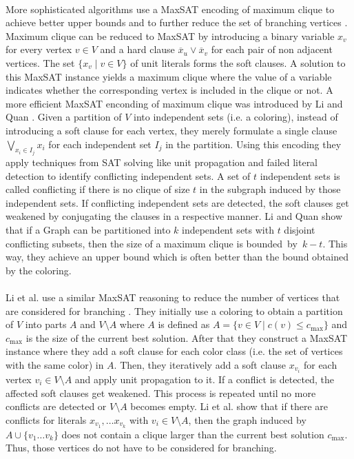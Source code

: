 \documentclass[]{article}
\begin{document}
\paragraph{}
More sophisticated algorithms use a MaxSAT encoding of maximum clique to achieve better upper bounds and to further reduce the set of branching vertices \cite{LiFangXu,LiJiang}. Maximum clique can be reduced to MaxSAT by introducing a binary variable $x_v$ for every vertex $v\in V$ and a hard clause $\overline{x}_u\lor\overline{x}_v$ for each pair of non adjacent vertices. The set $\{x_v\;|\;v\in V\}$ of unit literals forms the soft clauses. A solution to this MaxSAT instance yields a maximum clique where the value of a variable indicates whether the corresponding vertex is included in the clique or not. A more efficient MaxSAT enconding of maximum clique was introduced by Li and Quan \cite{LiQuan}. Given a partition of $V$ into independent sets (i.e. a coloring), instead of introducing a soft clause for each vertex, they merely formulate a single clause $\bigvee_{x_i\in I_j} x_i$ for each independent set $I_j$ in the partition. Using this encoding they apply techniques from SAT solving like unit propagation and failed literal detection to identify conflicting independent sets. A set of $t$ independent sets is called conflicting if there is no clique of size $t$ in the subgraph induced by those independent sets. If conflicting independent sets are detected, the soft clauses get weakened by conjugating the clauses in a respective manner. Li and Quan show that if a Graph can be partitioned into $k$ independent sets with $t$ disjoint conflicting subsets, then the size of a maximum clique is bounded~by~$k-t$. This way, they achieve an upper bound which is often better than the bound obtained by the coloring.
\paragraph{}
Li et al. use a similar MaxSAT reasoning to reduce the number of vertices that are considered for branching \cite{LiMaxSat}. They initially use a coloring to obtain a partition of $V$ into parts $A$ and $V\setminus A$ where $A$ is defined as $A = \{v\in V \;|\; c(v)\leq c_\text{max}\}$ and $c_\text{max}$ is the size of the current best solution. After that they construct a MaxSAT instance where they add a soft clause for each color class (i.e. the set of vertices with the same color) in $A$. Then, they iteratively add a soft clause $x_{v_i}$ for each vertex $v_i \in V\setminus A$ and apply unit propagation to it. If a conflict is detected, the affected soft clauses get weakened. This process is repeated until no more conflicts are detected or $V\setminus A$ becomes empty. Li et al. show that if there are conflicts for literals $x_{v_1},\dots x_{v_k}$ with $v_i\in V\setminus A$, then the graph induced by $A\cup\{v_1\dots v_k\}$ does not contain a clique larger than the current best solution $c_\text{max}$. Thus, those vertices do not have to be considered for branching.
\end{document}
